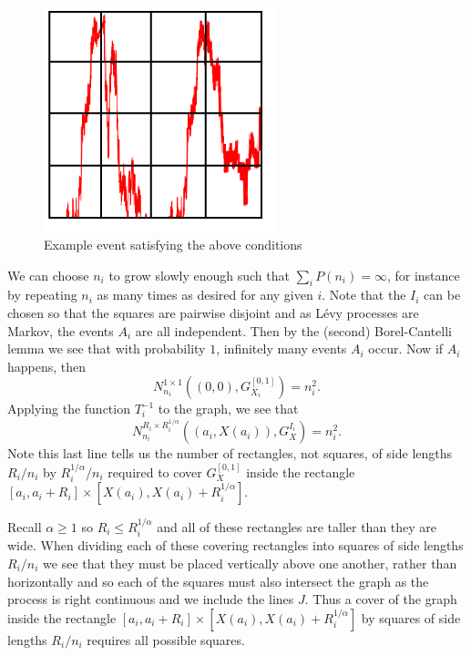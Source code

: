\begin{figure}[h]\label{fig:example-rectangle1}
    \centering
    \includegraphics[width=0.6\textwidth]{pics/ch-brownian/event-rectangles.png}
    \caption{Example event satisfying the above conditions}
    \label{fig:example-rectangle1}
\end{figure}

We can choose $n_i$ to grow slowly enough such that $\sum_{i}P(n_i)=\infty$, for instance by repeating $n_i$ as many times as desired for any given $i$. Note that the $I_i$ can be chosen so that the squares are pairwise disjoint and as L\'evy processes are Markov, the events $A_i$ are all independent. Then by the (second) Borel-Cantelli lemma we see that with probability $1$, infinitely many events $A_i$ occur. Now if $A_i$ happens, then
\[
N_{n_i}^{1 \times 1 }\left((0,0),G_{X_i}^{[0,1]}\right)=n_i^2.
\]
Applying the function $T^{-1}_i$ to the graph, we see that
\[
N_{n_i}^{R_i \times R_i^{1/\alpha} }\left((a_i,X(a_i)),G_{X}^{I_i}\right)=n_i^2.
\]
Note this last line tells us the number of rectangles, not squares, of side lengths $R_i / n_i$ by $R_i^{1/\alpha} / n_i$ required to cover $G_X^{[0,1]}$ inside the rectangle $[a_i, a_i + R_i] \times [X(a_i), X(a_i) + R_i^{1/\alpha}]$. 

Recall $\alpha \ge 1$ so $R_i\leq R_i^{1/\alpha}$ and all of these rectangles are taller than they are wide. When dividing each of these covering rectangles into squares of side lengths $R_i / n_i$ we see that they must be placed vertically above one another, rather than horizontally and so each of the squares must also intersect the graph as the process is right continuous and we include the lines $J$. Thus a cover of the graph inside the rectangle $[a_i, a_i + R_i] \times [X(a_i), X(a_i) + R_i^{1/\alpha}]$ by squares of side lengths $R_i / n_i$ requires all possible squares.

